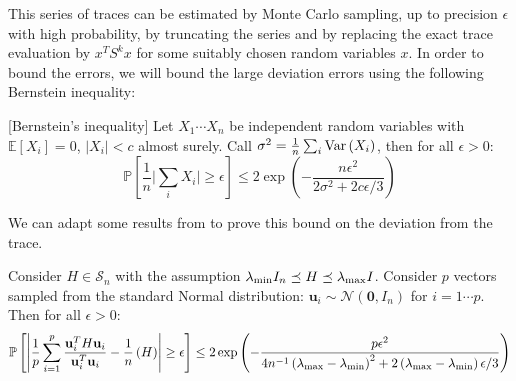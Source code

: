 This series of traces can be estimated by Monte Carlo sampling, up
to precision $\epsilon$ with high probability, by truncating the
series and by replacing the exact trace evaluation by $x^{T}S^{k}x$
for some suitably chosen random variables $x$. In order to bound
the errors, we will bound the large deviation errors using the following
Bernstein inequality: 
\begin{lemma}
{[}Bernstein's inequality{]} \label{lem:bernstein} Let $X_{1}\cdots X_{n}$
be independent random variables with $\mathbb{E}\left[X_{i}\right]=0$,
$\left|X_{i}\right|<c$ almost surely. Call $\sigma^{2}=\frac{1}{n}\sum_{i}\text{\textnormal{Var}}\left(X_{i}\right)$,
then for all $\epsilon>0$: 
\[
\mathbb{P}\left[\frac{1}{n}\Big|\sum_{i}X_{i}\Big|\geq\epsilon\right]\leq2\exp\left(-\frac{n\epsilon^{2}}{2\sigma^{2}+2c\epsilon/3}\right)
\]

\end{lemma}
We can adapt some results from \cite{Barry1999} to prove this bound
on the deviation from the trace. 
\begin{lemma}
\label{lem:bernstein-trace}Consider $H\in\mathcal{S}_{n}$ with the
assumption $\lambda_{\text{\textnormal{min}}}I_{n}\preceq H\preceq\lambda_{\text{\textnormal{max}}}I$.
Consider $p$ vectors sampled from the standard Normal distribution:
$\mathbf{u}_{i}\sim\mathcal{N}\left(\mathbf{0},I_{n}\right)$ for
$i=1\cdots p$. Then for all $\epsilon>0$: 
\[
\mathbb{P}\left[\left|\frac{1}{p}\sum_{i=1}^{p}\frac{\mathbf{u}_{i}^{T}H\mathbf{u}_{i}}{\mathbf{u}_{i}^{T}\mathbf{u}_{i}}-\frac{1}{n}\left(H\right)\right|\geq\epsilon\right]\leq2\exp\left(-\frac{p\epsilon^{2}}{4n^{-1}\left(\lambda_{\max}-\lambda_{\min}\right)^{2}+2\left(\lambda_{\max}-\lambda_{\min}\right)\epsilon/3}\right)
\]
\end{lemma}
